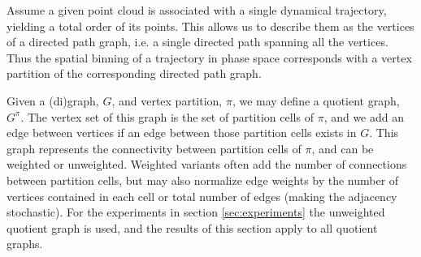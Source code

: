 \documentclass[pdflatex,bst/sn-mathphys-num]{sn-jnl}%
\theoremstyle{thmstyleone}%
\theoremstyle{definition}
\theoremstyle{thmstyletwo}%
\theoremstyle{thmstylethree}%
\begin{document}
Assume a given point cloud is associated with a single dynamical trajectory, yielding a total order of its points. This allows us to describe them as the vertices of a directed path graph, i.e. a single directed path spanning all the vertices. Thus the spatial binning of a trajectory in phase space corresponds with a vertex partition of the corresponding directed path graph. 

Given a (di)graph, $G$, and vertex partition, $\pi$, we may define a quotient graph, $G^\pi$. The vertex set of this graph is the set of partition cells of $\pi$, and we add an edge between vertices if an edge between those partition cells exists in $G$. This graph represents the connectivity between partition cells of $\pi$, and can be weighted or unweighted. Weighted variants often add the number of connections between partition cells, but may also normalize edge weights by the number of vertices contained in each cell or total number of edges (making the adjacency stochastic). For the experiments in section \ref{sec:experiments} the unweighted quotient graph is used, and the results of this section apply to all quotient graphs.



\end{document}

